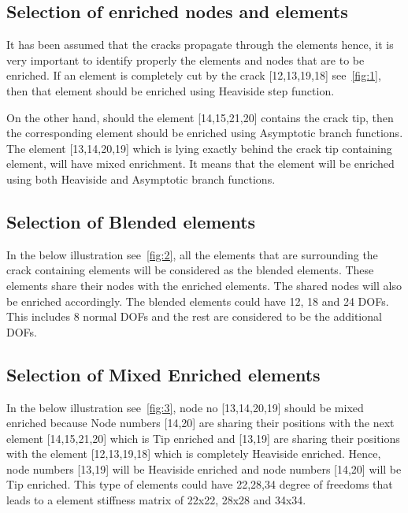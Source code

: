 \documentclass[fleqn, 12.5pt,a4paper]{report}
\begin{document}
\subsection{Selection of enriched nodes and elements}
It has been assumed that the cracks propagate through the elements \cite{belytschko1999elastic} hence, it is very important to identify properly the elements and nodes that are to be enriched. If an element is completely cut by the crack [12,13,19,18] see~\autoref{fig:1}, then that element should be enriched using Heaviside step function\cite{khoei2014extended}.

On the other hand, should the element [14,15,21,20] contains the crack tip, then the corresponding element should be enriched using Asymptotic branch functions\cite{pandey2019new}. The element [13,14,20,19] which is lying exactly\vspace{-0.25cm}  behind the crack tip containing element, will have mixed enrichment\cite{khoei2014extended}. It means that the element will be enriched using both Heaviside and Asymptotic branch functions.

\subsection{Selection of Blended elements}
In the below illustration see~\autoref{fig:2}, all the elements that are surrounding the crack containing elements will be considered as the blended elements\cite{khoei2014extended}. These elements share their nodes with the enriched elements. The shared nodes will also be enriched accordingly. The blended elements could have 12, 18 and 24 DOFs. This includes 8 normal DOFs and the rest are considered to be the additional DOFs. 

\subsection{Selection of Mixed Enriched elements}
In the below illustration see~\autoref{fig:3}, node no [13,14,20,19] should be mixed enriched because Node numbers [14,20] are sharing their positions with the next element [14,15,21,20] which is Tip enriched and [13,19] are sharing their positions with the element [12,13,19,18] which is completely Heaviside enriched. Hence, node numbers [13,19] will be Heaviside enriched and node numbers [14,20] will be Tip enriched. This type of elements could have 22,28,34 degree of freedoms that leads to a element stiffness matrix of 22x22, 28x28 and 34x34.
\end{document}
